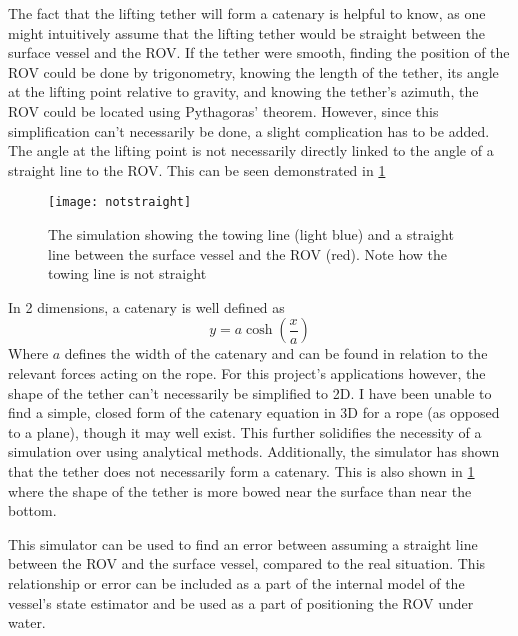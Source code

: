 The fact that the lifting tether will form a catenary is helpful to know, as one might intuitively assume that the lifting tether would be straight between the surface vessel and the ROV. If the tether were smooth, finding the position of the ROV could be done by trigonometry, knowing the length of the tether, its angle at the lifting point relative to gravity, and knowing the tether's azimuth, the ROV could be located using Pythagoras' theorem. However, since this simplification can't necessarily be done, a slight complication has to be added. The angle at the lifting point is not necessarily directly linked to the angle of a straight line to the ROV. This can be seen demonstrated in \cref{fig:notstraight}

\begin{figure}
	\centering
	\texttt{[image: notstraight]}
	\caption{The simulation showing the towing line (light blue) and a straight line between the surface vessel and the ROV (red). Note how the towing line is not straight}
	\label{fig:notstraight}
\end{figure}

In 2 dimensions, a catenary is well defined as 
\[y = a \cosh\left(\frac x a \right)\] 
Where \(a\) defines the width of the catenary and can be found in relation to the relevant forces acting on the rope. For this project's applications however, the shape of the tether can't necessarily be simplified to 2D. I have been unable to find a simple, closed form of the catenary equation in 3D for a rope (as opposed to a plane), though it may well exist. This further solidifies the necessity of a simulation over using analytical methods. Additionally, the simulator has shown that the tether does not necessarily form a catenary. This is also shown in \cref{fig:notstraight} where the shape of the tether is more bowed near the surface than near the bottom.

This simulator can be used to find an error between assuming a straight line between the ROV and the surface vessel, compared to the real situation. This relationship or error can be included as a part of the internal model of the vessel's state estimator and  be used as a part of positioning the ROV under water. 
